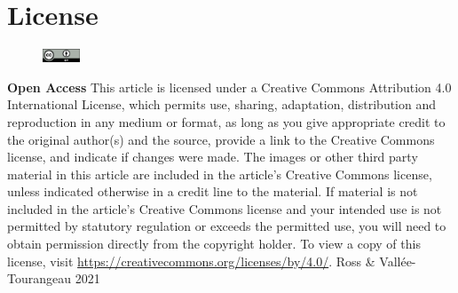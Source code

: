 \documentclass[twocolumn, serif, empirical, authordate]{jote-article}
\begin{document}
\printbibliography
\newpage


\section*{License}
        \begin{figure}%
        \vspace{-12pt}
        \includegraphics[width=0.1\textwidth]{media/by}%
        \end{figure}
        \textbf{Open Access} This article is licensed under a Creative Commons Attribution 4.0 International License, which permits use, sharing, adaptation, distribution and reproduction in any medium or format, as long as you give appropriate credit to the original author(s) and the source, provide a link to the Creative Commons license, and indicate if changes were made. The images or other third party material in this article are included in the article’s Creative Commons license, unless indicated otherwise in a credit line to the material. If material is not included in the article’s Creative Commons license and your intended use is not permitted by statutory regulation or exceeds the permitted use, you will need to obtain permission directly from the copyright holder. To view a copy of this license, visit \href{https://creativecommons.org/licenses/by/4.0/}{https://creativecommons.org/licenses/by/4.0/}.
        \newline\newline
        \textcopyright \text{ }Ross \&  Vallée-Tourangeau 2021
\end{document}
